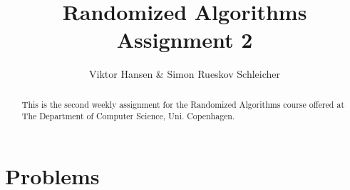 \documentclass[12pt]{article}
\begin{document}
\nocite{*}


\title{Randomized Algorithms \\
       Assignment 2}

\author{Viktor Hansen \& Simon Rueskov Schleicher}

\maketitle

\begin{abstract}
  This is the second weekly assignment for the Randomized Algorithms course offered at The Department of Computer Science, Uni. Copenhagen.
\end{abstract}

\pagebreak

\section*{Problems}
\end{document}
